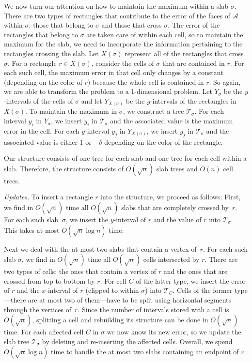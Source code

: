 \documentclass{elsart}
\newcommand{\A}{{\mathcal A}}
\newcommand{\tree}{{\mathcal T}}
\begin{document}
We now turn our attention on how to maintain the maximum within a slab
$\sigma$. There are two types of rectangles that contribute to the
error of the faces of $\A$ within $\sigma$: those that belong to
$\sigma$ and those that cross $\sigma$. The error of the
rectangles that belong to $\sigma$ are taken care of within each cell,
so to maintain the maximum for the slab, we need to incorporate the
information pertaining to the rectangles crossing the slab. Let
$X(\sigma)$ represent all of the rectangles that cross $\sigma$. For a
rectangle $r\in X(\sigma)$, consider the cells of $\sigma$ that are
contained in $r$. For each such cell, the maximum error in that
cell only changes by a constant (depending on the color of $r$)
because the whole cell is contained in $r$. So again, we are able to
transform the problem to a 1-dimensional problem. Let $Y_\sigma$ be the
$y$-intervals of the cells of $\sigma$ and let $Y_{X(\sigma)}$ be the
$y$-intervals of the rectangles in $X(\sigma)$. To maintain the
maximum in $\sigma$, we construct a tree $\tree_\sigma$. For each
interval $y_i$ in $Y_\sigma$, we insert $y_i$ in $\tree_\sigma$ and the
associated value is the maximum error in the cell. For each
$y$-interval $y_j$ in $Y_{X(\sigma)}$, we insert $y_j$ in
$\tree_\sigma$ and the associated value is either 1 or $-\delta$
depending on the color of the rectangle.

Our structure consists of one tree for each slab and one tree for each
cell within a slab. Therefore, the structure consists of $O(\sqrt{n})$
slab trees and $O(n)$ cell trees.

\emph{Updates.}
To insert a rectangle $r$ into the structure, we proceed as follows:
First, we find in $O(\sqrt{n})$ time all $O(\sqrt{n})$ slabs that are
completely crossed by~$r$. For each such slab~$\sigma$, we insert the
$y$-interval of $r$ and the value of $r$ into $\tree_{\sigma}$. This
takes at most $O(\sqrt{n}\log n)$ time.

Next we deal with the at most two slabs that contain a vertex
of~$r$. For each such slab $\sigma$, we find in $O(\sqrt{n})$ time all
$O(\sqrt{n})$ cells intersected by $r$. There are two types of cells:
the ones that contain a vertex of $r$ and the ones that are crossed
from top to bottom by $r$. For cell $C$ of the latter type, we insert
the error of $r$ and the $x$-interval of $r$ (clipped to within
$\sigma$) into $\tree_C$. Cells of the former type---there are at most
two of them---have to be split using horizontal segments through the
vertices of~$r$. Since the number of intervals stored with a cell is
$O(\sqrt{n})$, splitting a cell and rebuilding its structure can be
done in $O(\sqrt{n})$ time. For each affected cell $C$ in $\sigma$ we
now know its new error, so we update the slab tree $\tree_\sigma$ by
deleting and re-inserting the affected cells. Overall, we spend
$O(\sqrt{n}\log n)$ time to handle the at most two slabs containing an
endpoint of $r$.
\end{document}
